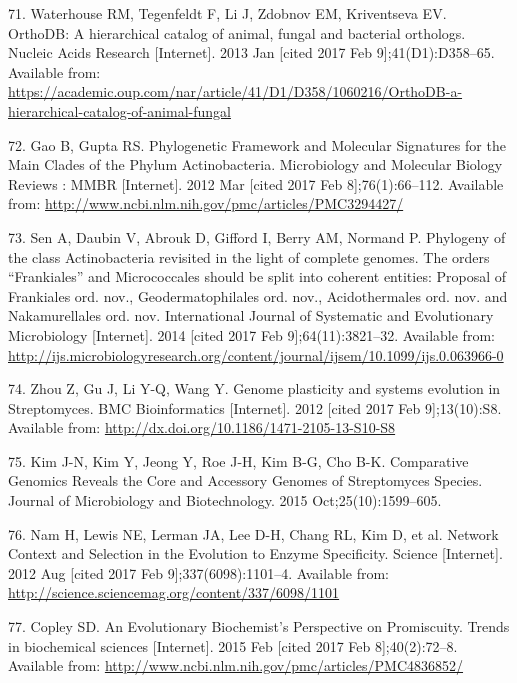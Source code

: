 \documentclass[12pt,twoside]{reedthesis}
\begin{document}
  \hypertarget{ref-waterhouse_orthodb_2013}{}
  71. Waterhouse RM, Tegenfeldt F, Li J, Zdobnov EM, Kriventseva EV.
  OrthoDB: A hierarchical catalog of animal, fungal and bacterial
  orthologs. Nucleic Acids Research {[}Internet{]}. 2013 Jan {[}cited 2017
  Feb 9{]};41(D1):D358--65. Available from:
  \url{https://academic.oup.com/nar/article/41/D1/D358/1060216/OrthoDB-a-hierarchical-catalog-of-animal-fungal}
  
  \hypertarget{ref-gao_phylogenetic_2012}{}
  72. Gao B, Gupta RS. Phylogenetic Framework and Molecular Signatures for
  the Main Clades of the Phylum Actinobacteria. Microbiology and Molecular
  Biology Reviews : MMBR {[}Internet{]}. 2012 Mar {[}cited 2017 Feb
  8{]};76(1):66--112. Available from:
  \url{http://www.ncbi.nlm.nih.gov/pmc/articles/PMC3294427/}
  
  \hypertarget{ref-sen_phylogeny_2014}{}
  73. Sen A, Daubin V, Abrouk D, Gifford I, Berry AM, Normand P. Phylogeny
  of the class Actinobacteria revisited in the light of complete genomes.
  The orders ``Frankiales'' and Micrococcales should be split into
  coherent entities: Proposal of Frankiales ord. nov., Geodermatophilales
  ord. nov., Acidothermales ord. nov. and Nakamurellales ord. nov.
  International Journal of Systematic and Evolutionary Microbiology
  {[}Internet{]}. 2014 {[}cited 2017 Feb 9{]};64(11):3821--32. Available
  from:
  \url{http://ijs.microbiologyresearch.org/content/journal/ijsem/10.1099/ijs.0.063966-0}
  
  \hypertarget{ref-zhou_genome_2012}{}
  74. Zhou Z, Gu J, Li Y-Q, Wang Y. Genome plasticity and systems
  evolution in Streptomyces. BMC Bioinformatics {[}Internet{]}. 2012
  {[}cited 2017 Feb 9{]};13(10):S8. Available from:
  \url{http://dx.doi.org/10.1186/1471-2105-13-S10-S8}
  
  \hypertarget{ref-kim_comparative_2015}{}
  75. Kim J-N, Kim Y, Jeong Y, Roe J-H, Kim B-G, Cho B-K. Comparative
  Genomics Reveals the Core and Accessory Genomes of Streptomyces Species.
  Journal of Microbiology and Biotechnology. 2015 Oct;25(10):1599--605.
  
  \hypertarget{ref-nam_network_2012}{}
  76. Nam H, Lewis NE, Lerman JA, Lee D-H, Chang RL, Kim D, et al. Network
  Context and Selection in the Evolution to Enzyme Specificity. Science
  {[}Internet{]}. 2012 Aug {[}cited 2017 Feb 9{]};337(6098):1101--4.
  Available from:
  \url{http://science.sciencemag.org/content/337/6098/1101}
  
  \hypertarget{ref-copley_evolutionary_2015}{}
  77. Copley SD. An Evolutionary Biochemist's Perspective on Promiscuity.
  Trends in biochemical sciences {[}Internet{]}. 2015 Feb {[}cited 2017
  Feb 8{]};40(2):72--8. Available from:
  \url{http://www.ncbi.nlm.nih.gov/pmc/articles/PMC4836852/}
  
\end{document}
